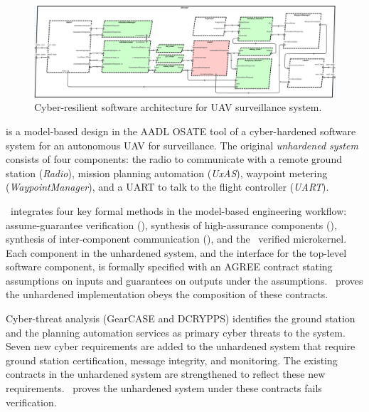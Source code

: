 \begin{figure}
	\begin{center}
	  \includegraphics[width=2\columnwidth]{./figs/sw-hardened.png}
  \end{center}
	\caption{Cyber-resilient software architecture for UAV surveillance system.} 
	\label{fig:sw-hardened} 
\end{figure}

 is a model-based design in the AADL OSATE tool of a cyber-hardened software system for an autonomous UAV for surveillance.
The original \emph{unhardened system} consists of four components: the radio to communicate with a remote ground
station (\emph{Radio}), mission planning automation (\emph{UxAS}), waypoint metering (\emph{WaypointManager}), and a UART to talk to the flight controller (\emph{UART}).

\briefcase\ integrates four key formal methods in the model-based engineering workflow: assume-guarantee verification (\agree), synthesis of high-assurance components (\splat), synthesis of inter-component communication (\hamr), and the \selFour\ verified microkernel.
Each component in the unhardened system, and the interface for the top-level software component, is formally specified with an AGREE contract stating assumptions on inputs and guarantees on outputs under the assumptions.
\agree\ proves the unhardened implementation obeys the composition of these contracts. 

Cyber-threat analysis (GearCASE and DCRYPPS) identifies the ground station and the planning automation services as primary cyber threats to the system.
Seven new cyber requirements are added to the unhardened system that require ground station certification, message integrity, and monitoring.
The existing contracts in the unhardened system are strengthened to reflect these new requirements.
\agree\ proves the unhardened system under these contracts fails verification. 

